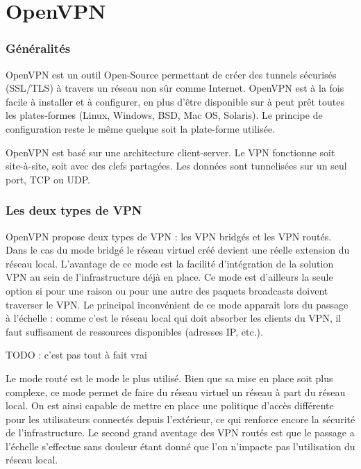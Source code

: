 \section{OpenVPN}

\subsubsection{Généralités}
OpenVPN est un outil Open-Source permettant de créer des tunnels sécurisés (SSL/TLS) à travers un réseau non sûr comme Internet. OpenVPN est à la fois facile à installer et à configurer, en plus d'être disponible sur à peut prêt toutes les plates-formes (Linux, Windows, BSD, Mac OS, Solaris). Le principe de configuration reste le même quelque soit la plate-forme utilisée.

OpenVPN est basé sur une architecture client-server. Le VPN fonctionne soit site-à-site, soit avec des clefs partagées. Les données sont tunnelisées sur un seul port, TCP ou UDP.

\subsubsection{Les deux types de VPN}
OpenVPN propose deux types de VPN : les VPN bridgés et les VPN routés. Dans le cas du mode bridgé le réseau virtuel créé devient une réelle extension du réseau local. L'avantage de ce mode est la facilité d'intégration de la solution VPN au sein de l'infrastructure déjà en place. Ce mode est d'ailleurs la seule option si pour une raison ou pour une autre des paquets broadcasts doivent traverser le VPN. Le principal inconvénient de ce mode apparait lors du passage à l'échelle : comme c'est le réseau local qui doit absorber les clients du VPN, il faut suffisament de ressources disponibles (adresses IP, etc.).

TODO : c'est pas tout à fait vrai

Le mode routé est le mode le plus utilisé. Bien que sa mise en place soit plus complexe, ce mode permet de faire du réseau virtuel un réseau à part du réseau local. On est ainsi capable de mettre en place une politique d'accès différente pour les utilisateurs connectés depuis l'extérieur, ce qui renforce encore la sécurité de l'infrastructure. Le second grand aventage des VPN routés est que le passage a l'échelle s'effectue sans douleur étant donné que l'on n'impacte pas l'utilisation du réseau local.

~

